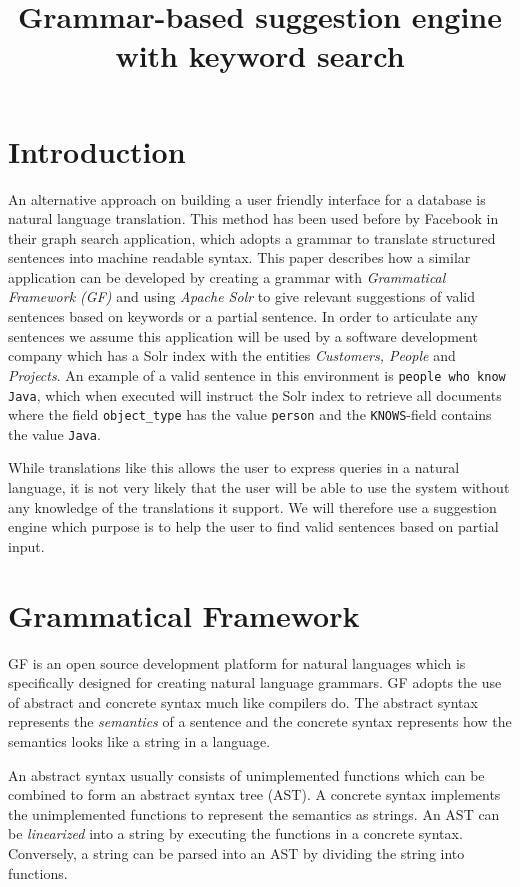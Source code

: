 \documentclass[10pt, a4paper]{article}
\title{Grammar-based suggestion engine with keyword search}
\begin{document}
\maketitleabstract

\section{Introduction}
An alternative approach on building a user friendly interface for a database is  natural language translation. This method has been used before by Facebook \cite{li:2013} in their graph search application, which adopts a grammar to translate structured sentences into machine readable syntax. This paper describes how a similar application can be developed by creating a grammar with \emph{Grammatical Framework (GF)} \cite{ranta:2013} and using \emph{Apache Solr} \cite{kuc:2011} to give relevant suggestions of valid sentences based on keywords or a partial sentence.
\newline
\newline
In order to articulate any sentences we assume this application will be used by a software development company which has a Solr index with the entities \emph{Customers, People} and \emph{Projects}. An example of a valid sentence in this environment is \texttt{people who know Java}, which when executed will instruct the Solr index to retrieve all documents where the field \texttt{object\_type} has the value \texttt{person} and the \texttt{KNOWS}-field contains the value \texttt{Java}. 

While translations like this allows the user to express queries in a natural language, it is not very likely that the user will be able to use the system without any knowledge of the translations it support. We will therefore use a suggestion engine which purpose is to help the user to find valid sentences based on partial input.

\section{Grammatical Framework}
GF is an open source development platform for natural languages which is specifically designed for creating natural language grammars. GF adopts the use of abstract and concrete syntax much like compilers do. The abstract syntax represents the \emph{semantics} of a sentence and the concrete syntax represents how the semantics looks like a string in a language. 

An abstract syntax usually consists of unimplemented functions which can be combined to form an abstract syntax tree (AST). A concrete syntax implements the unimplemented functions to represent the semantics as strings. An AST can be \emph{linearized} into a string by executing the functions in a concrete syntax. Conversely, a string can be parsed into an AST by dividing the string into functions.
\end{document}
